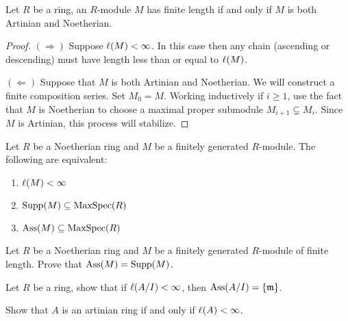 \documentclass{ximera}
\begin{document}
\begin{corollary}
  Let $R$ be a ring, an $R$-module $M$ has finite length if and only
  if $M$ is both Artinian and Noetherian.
  \begin{proof}
    $(\Rightarrow)$ Suppose $\ell(M)<\infty$. In this case then any
    chain (ascending or descending) must have length less than or
    equal to $\ell(M)$.

    $(\Leftarrow)$ Suppose that $M$ is both Artinian and Noetherian.
    We will construct a finite composition series. Set $M_0 =
    M$. Working inductively if $i\ge 1$, use the fact that $M$ is
    Noetherian to choose a maximal proper submodule $M_{i+1}\subsetneq
    M_i$. Since $M$ is Artinian, this process will stabilize.
  \end{proof}
\end{corollary}





\begin{exercise}
  Let $R$ be a Noetherian ring and $M$ be a finitely generated
  $R$-module. The following are equivalent:
  \begin{enumerate}
  \item $\ell(M)<\infty$
  \item $\operatorname{Supp}(M)\subseteq\operatorname{MaxSpec}(R)$
  \item $\operatorname{Ass}(M)\subseteq\operatorname{MaxSpec}(R)$
  \end{enumerate}
\end{exercise}

\begin{exercise}
  Let $R$ be a Noetherian ring and $M$ be a finitely generated
  $R$-module of finite length. Prove that $\operatorname{Ass}(M) = \operatorname{Supp}(M)$.
\end{exercise}

\begin{exercise}
  Let $R$ be a ring, show that if $\ell(A/I)<\infty$, then $\operatorname{Ass}(A/I) =
  \{\mathfrak{m}\}$.
\end{exercise}


\begin{exercise}
  Show that $A$ is an artinian ring if and only if $\ell(A)<\infty$.
\end{exercise}

\end{document}
